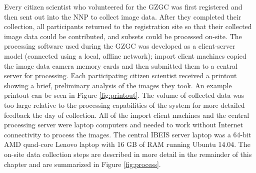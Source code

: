 Every citizen scientist who volunteered for the GZGC was first registered and then sent out into the NNP to collect image data.  After they completed their collection, all participants returned to the registration site so that their collected image data could be contributed, and subsets could be processed on-site.  The processing software used during the GZGC was developed as a client-server model (connected using a local, offline network); import client machines copied the image data    camera memory cards and then submitted them to a central server for processing.  Each participating citizen scientist received a printout showing a brief, preliminary analysis of the images they took.  An example printout can be seen in Figure \ref{fig:printout}.  The volume of collected data was too large relative to the processing capabilities of the system for more detailed feedback the day of collection.  All of the import client machines and the central processing server were laptop computers and needed to work without Internet connectivity to process the images.  The central IBEIS server laptop was a 64-bit AMD quad-core Lenovo laptop with 16 GB of RAM running Ubuntu 14.04.  The on-site data collection steps are described in more detail in the remainder of this chapter and are summarized in Figure \ref{fig:process}.


